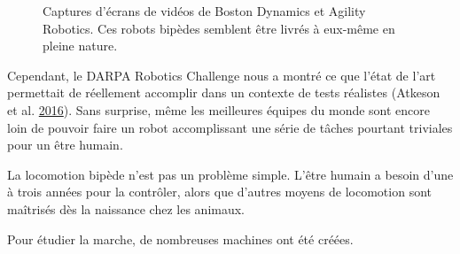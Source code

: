 \documentclass[french,A4paper,]{book}
\begin{document}
\begin{figure}
\centering

\hspace*{\fill}
\hfill%
\hspace*{\fill}

\caption{Captures d'écrans de vidéos de Boston Dynamics et Agility
Robotics. Ces robots bipèdes semblent être livrés à eux-même en pleine
nature.}

\label{fig:videos}

\end{figure}

Cependant, le DARPA Robotics Challenge nous a montré ce que l'état de
l'art permettait de réellement accomplir dans un contexte de tests
réalistes (Atkeson et al. \protect\hyperlink{ref-atkeson16}{2016}). Sans
surprise, même les meilleures équipes du monde sont encore loin de
pouvoir faire un robot accomplissant une série de tâches pourtant
triviales pour un être humain.

La locomotion bipède n'est pas un problème simple. L'être humain a
besoin d'une à trois années pour la contrôler, alors que d'autres moyens
de locomotion sont maîtrisés dès la naissance chez les animaux.

Pour étudier la marche, de nombreuses machines ont été créées.
\end{document}
